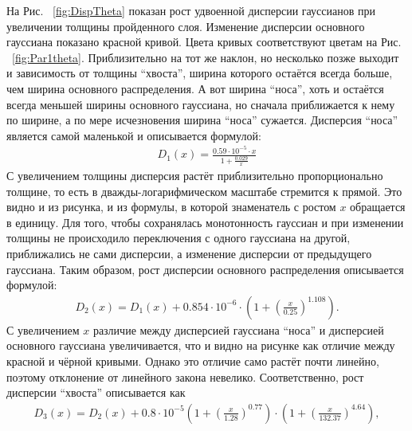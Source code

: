 \documentclass[a4paper,12pt]{article}
\begin{document}
\begin{large}
  На Рис. ~\ref{fig:DispTheta} показан рост удвоенной дисперсии гауссианов при увеличении толщины пройденного слоя.
  Изменение дисперсии основного гауссиана показано красной кривой.
  Цвета кривых соответствуют цветам на Рис. ~\ref{fig:Par1theta}.
  Приблизительно на тот же наклон, но несколько позже выходит и зависимость от толщины ``хвоста'', ширина которого остаётся всегда больше, чем ширина основного распределения.
  А вот ширина ``носа'', хоть и остаётся всегда меньшей ширины основного гауссиана, но сначала приближается к нему по ширине, а по мере исчезновения ширина ``носа'' сужается.
  Дисперсия ``носа'' является самой маленькой и описывается формулой:
\begin{equation}
\label{MSApproximationD1}
\begin{aligned} 
D_1(x)=\frac{0.59\cdot 10^{-5}\cdot x}{1+\frac{0.029}{x}} 
\end{aligned}
\end{equation}
С увеличением толщины дисперсия растёт приблизительно пропорционально толщине, то есть в дважды-логарифмическом масштабе стремится к прямой.
Это видно и из рисунка, и из формулы, в которой знаменатель с ростом $x$ обращается в единицу.
Для того, чтобы сохранялась монотонность гауссиан и при изменении толщины не происходило переключения с одного гауссиана на другой, приближались не сами дисперсии, а изменение дисперсии от предыдущего гауссиана.
Таким образом, рост дисперсии основного распределения описывается формулой:
\begin{equation}
\label{MSApproximationD2}
\begin{aligned} 
D_2(x)=D_1(x)+0.854\cdot 10^{-6}\cdot\left( 1+(\frac{x}{0.25})^{1.108}\right). 
\end{aligned}
\end{equation}
С увеличением $x$ различие между дисперсией гауссиана ``носа'' и дисперсией основного гауссиана увеличивается, что и видно на рисунке как отличие между красной и чёрной кривыми.
Однако это отличие само растёт почти линейно, поэтому отклонение от линейного закона невелико.
Соответственно, рост дисперсии ``хвоста'' описывается как
\begin{equation}
\label{MSApproximationD3}
\begin{aligned} 
D_3(x)=D_2(x)+0.8\cdot 10^{-5}\left( 1+(\frac{x}{1.28})^{0.77}\right)\cdot\left( 1+(\frac{x}{132.37})^{4.64}\right), 
\end{aligned}
\end{equation}



\end{large}
\end{document}
